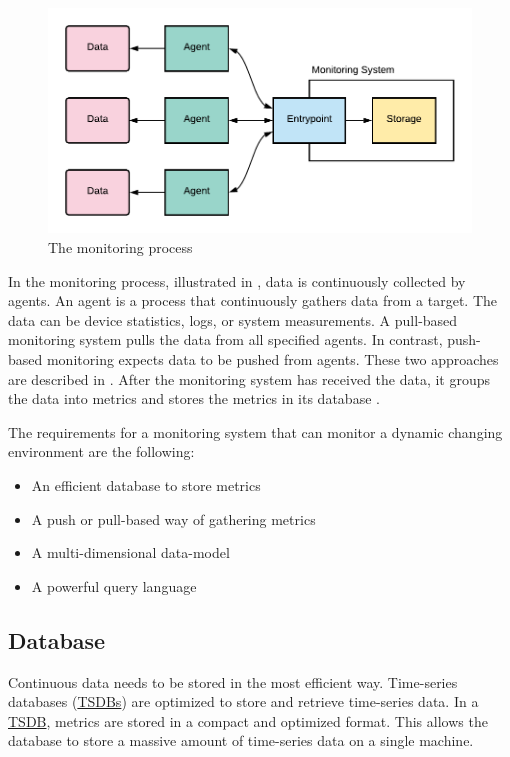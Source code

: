 \begin{figure}[h]
\centering
\includegraphics[scale=0.9]{images/02_theoretical_foundation/monitoring/monitoring_system}
\caption{The monitoring process}
\label{fig:mon_mon-system-process}
\end{figure}
In the monitoring process, illustrated in , data is continuously collected by agents. An agent is a process that continuously gathers data from a target. The data can be device statistics, logs, or system measurements. A pull-based monitoring system pulls the data from all specified agents. In contrast, push-based monitoring expects data to be pushed from agents. These two approaches are described in . After the monitoring system has received the data, it groups the data into metrics and stores the metrics in its database \cite{Ligus2012EffMonitoring}.


The requirements for a monitoring system that can monitor a dynamic changing environment are the following:
\begin{itemize}
\item An efficient database to store metrics \cite{Farcic2017Toolkit21}
\item A push or pull-based way of gathering metrics \cite{Farcic2017Toolkit21}
\item A multi-dimensional data-model \cite{Farcic2017Toolkit21}
\item A powerful query language \cite{Farcic2017Toolkit21}
\end{itemize}


\subsection{Database}
Continuous data needs to be stored in the most efficient way.
Time-series databases (\hyperlink{abbr:tsdb}{TSDBs}) are optimized to store and retrieve time-series data.
In a \hyperlink{abbr:tsdb}{TSDB}, metrics are stored in a compact and optimized format. This allows the database to store a massive amount of time-series data on a single machine.


